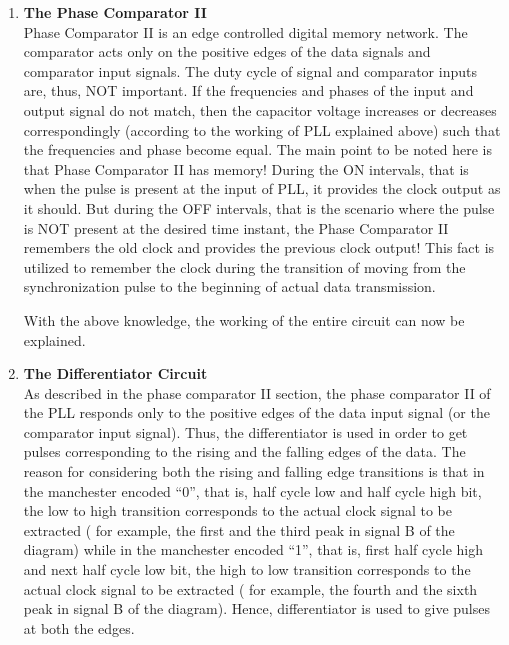 \documentclass{article}
\begin{document}
\begin{enumerate}[label=(\Alph*)]
\item \textbf{The Phase Comparator II}\\
  Phase Comparator II is an edge controlled digital memory network. The comparator acts only on the positive edges of the data signals and comparator input signals. The duty cycle of signal and comparator inputs are, thus, NOT important. If the frequencies and phases of the input and output signal do not match, then the capacitor voltage increases or decreases correspondingly (according to the working of PLL explained above) such that the frequencies and phase become equal. The main point to be noted here is that Phase Comparator II has memory! During the ON intervals, that is when the pulse is present at the input of PLL, it provides the clock output as it should. But during the OFF intervals, that is the scenario where the pulse is NOT present at the desired time instant, the Phase Comparator II remembers the old clock and provides the previous clock output! This fact is utilized to remember the clock during the transition of moving from the synchronization pulse to the beginning of actual data transmission.

With the above knowledge, the working of the entire circuit can now be explained.


\item \textbf{The Differentiator Circuit}\\
  As described in the phase comparator II section, the phase comparator II of the PLL responds only to the positive edges of the data input signal (or the comparator input signal). Thus, the differentiator is used in order to get pulses corresponding to the rising and the falling edges of the data. The reason for considering both the rising and falling edge transitions is that in the manchester encoded “0”, that is, half cycle low and half cycle high bit, the low to high transition corresponds to the actual clock signal to be extracted ( for example, the first and the third peak in signal B of the diagram) while in the manchester encoded “1”, that is, first half cycle high and next half cycle low bit, the high to low transition corresponds to the actual clock signal to be extracted ( for example, the fourth and the sixth peak in signal B of the diagram). Hence, differentiator is used to give pulses at both the edges.


\end{enumerate}
\end{document}
